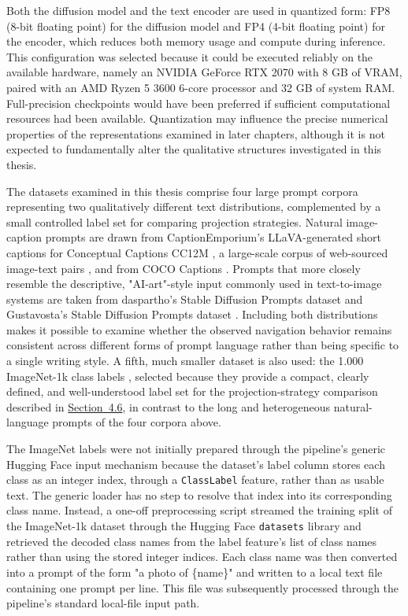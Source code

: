 Both the diffusion model and the text encoder are used in quantized form: FP8 (8-bit floating point) for the diffusion model and FP4 (4-bit floating point) for the encoder, which reduces both memory usage and compute during inference. This configuration was selected because it could be executed reliably on the available hardware, namely an NVIDIA GeForce RTX 2070 with 8 GB of VRAM, paired with an AMD Ryzen 5 3600 6-core processor and 32 GB of system RAM. Full-precision checkpoints would have been preferred if sufficient computational resources had been available. Quantization may influence the precise numerical properties of the representations examined in later chapters, although it is not expected to fundamentally alter the qualitative structures investigated in this thesis.

The datasets examined in this thesis comprise four large prompt corpora representing two qualitatively different text distributions, complemented by a small controlled label set for comparing projection strategies. Natural image-caption prompts are drawn from CaptionEmporium's LLaVA-generated short captions for Conceptual Captions CC12M \cite{captionemporium2026cc12mllavanext}, a large-scale corpus of web-sourced image-text pairs \cite{changpinyo2021cc12m}, and from COCO Captions \cite{jxie2026cococaptions}. Prompts that more closely resemble the descriptive, "AI-art"-style input commonly used in text-to-image systems are taken from daspartho's Stable Diffusion Prompts dataset \cite{daspartho2026sdprompts} and Gustavosta's Stable Diffusion Prompts dataset \cite{gustavosta2026sdprompts}. Including both distributions makes it possible to examine whether the observed navigation behavior remains consistent across different forms of prompt language rather than being specific to a single writing style.
A fifth, much smaller dataset is also used: the 1.000 ImageNet-1k class labels \cite{ilsvrc2026imagenet1k}, selected because they provide a compact, clearly defined, and well-understood label set for the projection-strategy comparison described in \hyperref[sec:4.6]{Section~4.6}, in contrast to the long and heterogeneous natural-language prompts of the four corpora above.

The ImageNet labels were not initially prepared through the pipeline's generic Hugging Face input mechanism because the dataset's label column stores each class as an integer index, through a \texttt{ClassLabel} feature, rather than as usable text. The generic loader has no step to resolve that index into its corresponding class name. Instead, a one-off preprocessing script streamed the training split of the ImageNet-1k dataset through the Hugging Face \texttt{datasets} library and retrieved the decoded class names from the label feature's list of class names rather than using the stored integer indices. Each class name was then converted into a prompt of the form "a photo of \{name\}" and written to a local text file containing one prompt per line. This file was subsequently processed through the pipeline's standard local-file input path.

